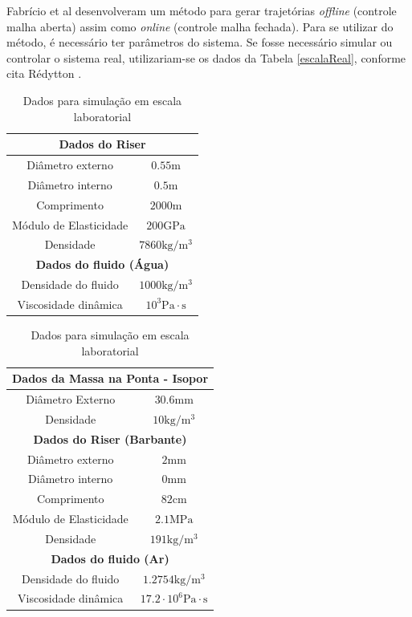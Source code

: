 Fabrício et al \cite{fabricioIFAC} desenvolveram um método para gerar trajetórias \textit{offline} (controle malha aberta) assim como \textit{online} (controle malha fechada). Para se utilizar do método, é necessário ter parâmetros do sistema. Se fosse necessário simular ou controlar o sistema real, utilizariam-se os dados da Tabela \ref{escalaReal}, conforme cita Rédytton \cite{redytton}.

\begin{table}[!ht]
\parbox{.45\linewidth}{
\centering
\caption{Dados para simulação em escala real\label{escalaReal} \cite{redytton}}
\vspace{0.5cm}
	\begin{tabular}{|c|c|}
	\hline
		\multicolumn{2}{|c|}{\textbf{Dados do Riser}}\\ \hline
		Diâmetro externo & $0.55\mathrm{m}$\\ \hline
		Diâmetro interno & $0.5\mathrm{m}$ \\ \hline
		Comprimento & $2000\mathrm{m}$ \\ \hline
		Módulo de Elasticidade & $200 \mathrm{GPa}$\\ \hline
		Densidade &  $7860\mathrm{kg}/\mathrm{m}^3$\\ \hline
		\multicolumn{2}{|c|}{\textbf{Dados do fluido (Água)}}\\ \hline
		Densidade do fluido &  $1000\mathrm{kg}/\mathrm{m}^3$\\ \hline
		Viscosidade dinâmica & $10^3 \mathrm{Pa}\cdot \mathrm{s}$ \\ \hline
	\end{tabular}
}
\hfill
\parbox{.45\linewidth}{
	\caption{Dados para simulação em escala laboratorial\label{escalaLaboratorial}}
	\centering
	\vspace{0.5cm}
	\begin{tabular}{|c|c|}
		\hline
			\multicolumn{2}{|c|}{\textbf{Dados da Massa na Ponta - Isopor}} \\ \hline
			Diâmetro Externo & $30.6\mathrm{mm}$\\ \hline
			Densidade & $10\mathrm{kg}/\mathrm{m}^3$ \\ \hline
			\multicolumn{2}{|c|}{\textbf{Dados do Riser (Barbante)}}\\ \hline
			Diâmetro externo & $2\mathrm{mm}$\\ \hline
			Diâmetro interno & $0\mathrm{mm}$ \\ \hline
			Comprimento & $82\mathrm{cm}$ \\ \hline
			Módulo de Elasticidade & $2.1 \mathrm{MPa}$\\ \hline
			Densidade &  $191\mathrm{kg}/\mathrm{m}^3$\\ \hline
			\multicolumn{2}{|c|}{\textbf{Dados do fluido (Ar)}}\\ \hline
			Densidade do fluido &  $1.2754\mathrm{kg}/\mathrm{m}^3$\\ \hline
			Viscosidade dinâmica & $17.2\cdot 10^6 \mathrm{Pa}\cdot \mathrm{s}$ \\ \hline
		\end{tabular}
}

\end{table}

